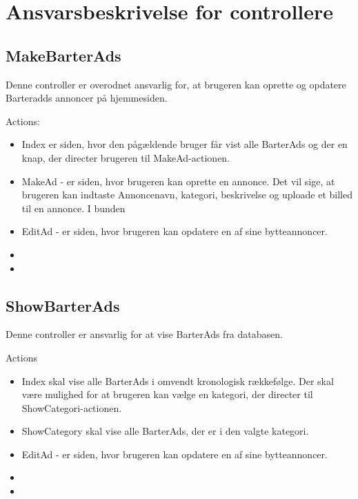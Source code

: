 \chapter{Ansvarsbeskrivelse for controllere}\label{ch:Controllere}

\section{MakeBarterAds}
Denne controller er overodnet ansvarlig for, at brugeren kan oprette og opdatere Barteradds annoncer på hjemmesiden.

Actions:
\begin{itemize}
	\item Index er siden, hvor den pågældende bruger får vist alle BarterAds og der en knap, der directer brugeren til MakeAd-actionen.
	\item MakeAd - er siden, hvor brugeren kan oprette en annonce. Det vil sige, at brugeren kan indtaste Annoncenavn, kategori, beskrivelse og uploade et billed til en annonce. I bunden
	\item EditAd - er siden, hvor brugeren kan opdatere en af sine bytteannoncer.
	\item 
	\item
\end{itemize}

\section{ShowBarterAds}
Denne controller er ansvarlig for at vise BarterAds fra databasen.

Actions 
\begin{itemize}
	\item Index skal vise alle BarterAds i omvendt kronologisk rækkefølge. Der skal være mulighed for at brugeren kan vælge en kategori, der directer til ShowCategori-actionen.
	\item ShowCategory skal vise alle BarterAds, der er i den valgte kategori.
	\item EditAd - er siden, hvor brugeren kan opdatere en af sine bytteannoncer.
	\item 
	\item
\end{itemize}